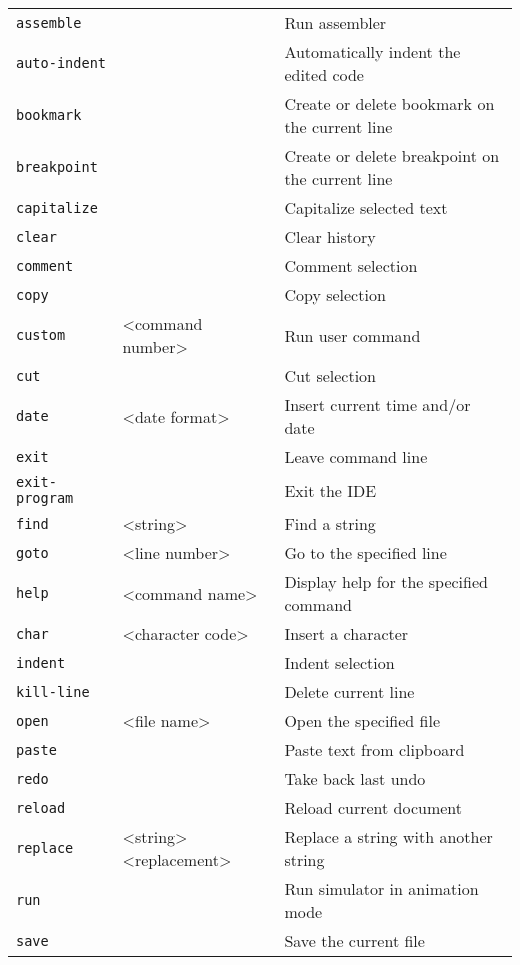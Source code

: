 \documentclass[a4paper,twoside,12pt]{book}
\begin{document}
{\begin{longtable}{l|ll}
				\texttt{assemble}	&			& Run assembler						\\
				\texttt{auto-indent}	&			& Automatically indent the edited code			\\
				\texttt{bookmark}	&			& Create or delete bookmark on the current line		\\
				\texttt{breakpoint}	&			& Create or delete breakpoint on the current line	\\
				\texttt{capitalize}	&			& Capitalize selected text				\\
				\texttt{clear}		&			& Clear history						\\
				\texttt{comment}	&			& Comment selection					\\
				\texttt{copy}		&			& Copy selection					\\
				\texttt{custom}		& <command number>	& Run user command					\\
				\texttt{cut}		&			& Cut selection						\\
				\texttt{date}		& <date format>		& Insert current time and/or date			\\
				\texttt{exit}		&			& Leave command line					\\
				\texttt{exit-program}	&			& Exit the IDE						\\
				\texttt{find}		& <string>		& Find a string						\\
				\texttt{goto}		& <line number>		& Go to the specified line				\\
				\texttt{help}		& <command name>	& Display help for the specified command		\\
				\texttt{char}		& <character code>	& Insert a character					\\
				\texttt{indent}		&			& Indent selection					\\
				\texttt{kill-line}	&			& Delete current line					\\
				\texttt{open}		& <file name>		& Open the specified file				\\
				\texttt{paste}		&			& Paste text from clipboard 				\\
				\texttt{redo}		&			& Take back last undo					\\
				\texttt{reload}		&			& Reload current document				\\
				\texttt{replace}	& <string> <replacement>& Replace a string with another string			\\
				\texttt{run}		&			& Run simulator in animation mode			\\
				\texttt{save}		&			& Save the current file					\\

\end{longtable}}
\end{document}
